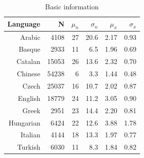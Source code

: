\documentclass[paper=a4, fontsize=11pt]{scrartcl} %
\begin{document}
\begin{table}[ht]
\centering
\begin{tabular}{rrrrrr}
  Language & N & $\mu_{n}$ & $\sigma_{n}$ & $\mu_{x}$ & $\sigma_{x}$ \\
  \midrule
Arabic & 4108 & 27 & 20.6 & 2.17 & 0.93 \\
  Basque & 2933 & 11 & 6.5 & 1.96 & 0.69 \\
  Catalan & 15053 & 26 & 13.6 & 2.32 & 0.70 \\
  Chinese & 54238 & 6 & 3.3 & 1.44 & 0.48 \\
  Czech & 25037 & 16 & 10.7 & 2.02 & 0.87 \\
  English & 18779 & 24 & 11.2 & 3.05 & 0.90 \\
  Greek & 2951 & 23 & 14.4 & 2.20 & 0.81 \\
  Hungarian & 6424 & 22 & 12.6 & 3.88 & 1.78 \\
  Italian & 4144 & 18 & 13.3 & 1.97 & 0.77 \\
  Turkish & 6030 & 11 & 8.3 & 1.84 & 0.82 \\
   \bottomrule
\end{tabular}
\caption{Basic information}
\label{tab:bi}
\end{table}
\end{document}
